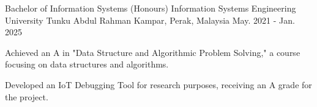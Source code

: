 

\begin{cventries}

  \cventry
    {Bachelor of Information Systems (Honours) Information Systems Engineering} %
    {University Tunku Abdul Rahman} %
    {Kampar, Perak, Malaysia} %
    {May. 2021 - Jan. 2025} %
    {
      \begin{cvitems} %
        \item {Achieved an A in "Data Structure and Algorithmic Problem Solving," a course focusing on data structures and algorithms.}
        \item {Developed an IoT Debugging Tool for research purposes, receiving an A grade for the project.}
      \end{cvitems}
    }
\end{cventries}

